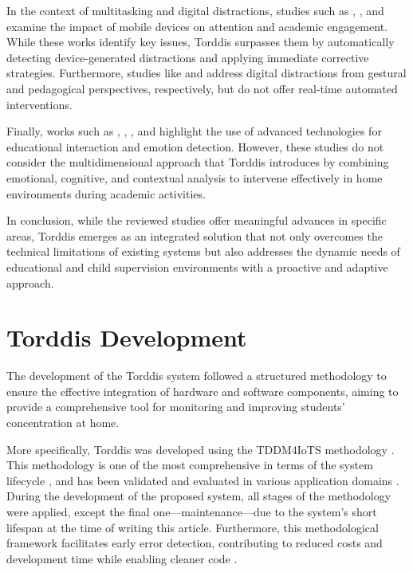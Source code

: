 			In the context of multitasking and digital distractions, studies such as \cite{Hartley2022Smartphone}, \cite{Labar2019Interplay}, and \cite{Farsani2020} examine the impact of mobile devices on attention and academic engagement. While these works identify key issues, Torddis surpasses them by automatically detecting device-generated distractions and applying immediate corrective strategies. Furthermore, studies like \cite{Erazo2016Easing} and \cite{Wang2022Empowering} address digital distractions from gestural and pedagogical perspectives, respectively, but do not offer real-time automated interventions.
			
			Finally, works such as \cite{Kulkarni2023}, \cite{Enadula2021}, \cite{Ozdamli2022}, and \cite{Warren2015Brief} highlight the use of advanced technologies for educational interaction and emotion detection. However, these studies do not consider the multidimensional approach that Torddis introduces by combining emotional, cognitive, and contextual analysis to intervene effectively in home environments during academic activities.
			
			In conclusion, while the reviewed studies offer meaningful advances in specific areas, Torddis emerges as an integrated solution that not only overcomes the technical limitations of existing systems but also addresses the dynamic needs of educational and child supervision environments with a proactive and adaptive approach.
	
	\section{Torddis Development}
	\label{section:fourth}
		The development of the Torddis system followed a structured methodology to ensure the effective integration of hardware and software components, aiming to provide a comprehensive tool for monitoring and improving students’ concentration at home.
		
		More specifically, Torddis was developed using the TDDM4IoTS methodology \citep{Guerrero-Ulloa2020TDDM4IoTS}. This methodology is one of the most comprehensive in terms of the system lifecycle \citep{Guerrero2023Agile}, and has been validated and evaluated in various application domains  \citep{Guerrero-Ulloa2020IoT, Guerrero-Ulloa2022Internet, Guerrero-Ulloa2023DevIdeAir, Guerrero-Ulloa2023SP4, Guerrero-Ulloa2023Nawi}. During the development of the proposed system, all stages of the methodology were applied, except the final one—maintenance—due to the system’s short lifespan at the time of writing this article. Furthermore, this methodological framework facilitates early error detection, contributing to reduced costs and development time while enabling cleaner code \citep{Beck2002TDD}.
		
